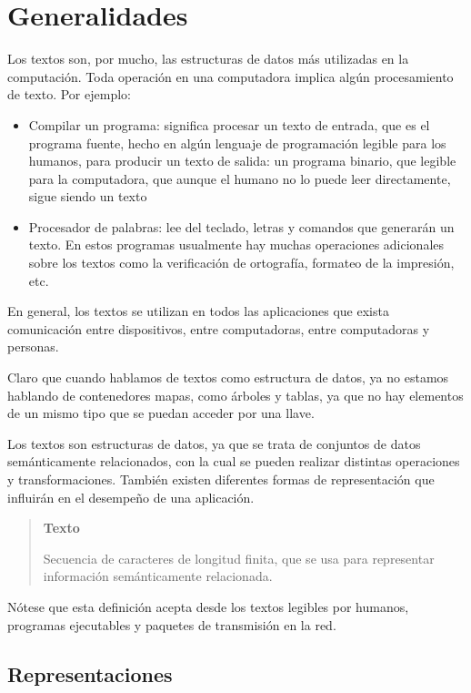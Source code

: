\section{Generalidades}
Los textos son, por mucho, las estructuras de datos más utilizadas en
la computación.  Toda operación en una computadora implica algún
procesamiento de texto.  Por ejemplo:

\begin{itemize}
\item Compilar un programa: significa procesar un texto de entrada,
  que es el programa fuente, hecho en algún lenguaje de programación
  legible para los humanos, para producir un texto de salida: un
  programa binario, que legible para la computadora, que aunque el
  humano no lo puede leer directamente, sigue siendo un texto
\item Procesador de palabras: lee del teclado, letras y comandos que
  generarán un texto.  En estos programas usualmente hay muchas
  operaciones adicionales sobre los textos como la verificación de
  ortografía, formateo de la impresión, etc.
\end{itemize}

En general, los textos se utilizan en todos las aplicaciones que
exista comunicación entre dispositivos, entre computadoras, entre
computadoras y personas.

Claro que cuando hablamos de textos como estructura de datos, ya no
estamos hablando de contenedores mapas, como árboles y tablas, ya que
no hay elementos de un mismo tipo que se puedan acceder por una llave.

Los textos son estructuras de datos, ya que se trata de conjuntos de
datos semánticamente relacionados, con la cual se pueden realizar
distintas operaciones y transformaciones.  También existen diferentes
formas de representación que influirán en el desempeño de una
aplicación.

\begin{quote}
  \textbf{Texto}

  Secuencia de caracteres de longitud finita, que se usa para
  representar información semánticamente relacionada.
\end{quote}

Nótese que esta definición acepta desde los textos legibles por
humanos, programas ejecutables y paquetes de transmisión en la red.

\subsection{Representaciones}
\label{sec:representaciones}

